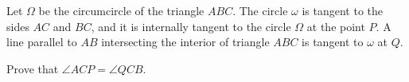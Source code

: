 Let $\Omega$ be the circumcircle of the triangle $ABC$. The circle $\omega$ is tangent to the sides $AC$ and $BC$, and it is internally tangent to the circle $\Omega$ at the point $P$.  A line parallel to $AB$ intersecting the interior of triangle $ABC$ is tangent to $\omega$ at $Q$.

Prove that $\angle{ACP}=\angle{QCB}$.